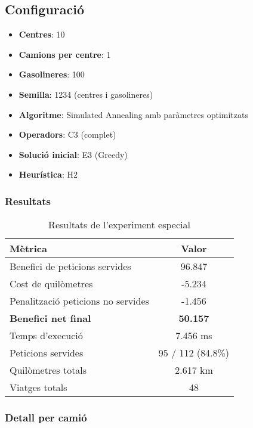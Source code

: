 \subsection{Configuració}
\begin{itemize}
    \item \textbf{Centres}: 10
    \item \textbf{Camions per centre}: 1
    \item \textbf{Gasolineres}: 100
    \item \textbf{Semilla}: 1234 (centres i gasolineres)
    \item \textbf{Algoritme}: Simulated Annealing amb paràmetres optimitzats
    \item \textbf{Operadors}: C3 (complet)
    \item \textbf{Solució inicial}: E3 (Greedy)
    \item \textbf{Heurística}: H2
\end{itemize}

\subsubsection{Resultats}

\begin{table}[H]
\centering
\begin{tabular}{@{}lc@{}}
\toprule
\textbf{Mètrica} & \textbf{Valor} \\
\midrule
Benefici de peticions servides & 96.847 \\
Cost de quilòmetres & -5.234 \\
Penalització peticions no servides & -1.456 \\
\midrule
\textbf{Benefici net final} & \textbf{50.157} \\
\midrule
Temps d'execució & 7.456 ms \\
Peticions servides & 95 / 112 (84.8\%) \\
Quilòmetres totals & 2.617 km \\
Viatges totals & 48 \\
\bottomrule
\end{tabular}
\caption{Resultats de l'experiment especial}
\label{tab:exp8-especial}
\end{table}

\subsubsection{Detall per camió}

